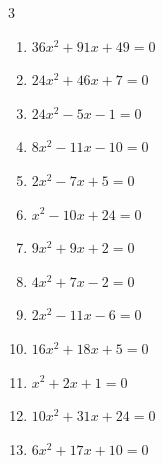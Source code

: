 \begin{multicols}{3}
\begin{enumerate}
  \item $36x^{2}+91x+49=0$


  \item $24x^{2}+46x+7=0$


  \item $24x^{2}-5x-1=0$


  \item $8x^{2}-11x-10=0$


  \item $2x^{2}-7x+5=0$


  \item $x^{2}-10x+24=0$

        \phantom{$\displaystyle x=4,\; 6$}

  \item $9x^{2}+9x+2=0$


\columnbreak %

  \item $4x^{2}+7x-2=0$


  \item $2x^{2}-11x-6=0$


  \item $16x^{2}+18x+5=0$


  \item $x^{2}+2x+1=0$

        \phantom{$\displaystyle x=-1$}

  \item $10x^{2}+31x+24=0$


  \item $6x^{2}+17x+10=0$


\end{enumerate}
\end{multicols}
